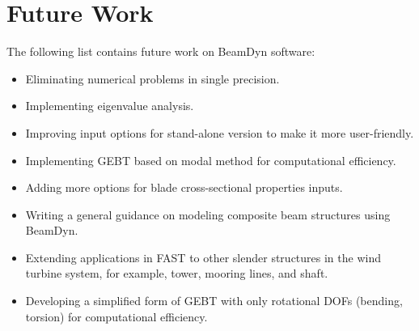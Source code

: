 \chapter{Future Work}
\label{sec:FutureWork}
The following list contains future work on BeamDyn software:

\begin{itemize}
   \item Eliminating numerical problems in single precision.
    \item Implementing eigenvalue analysis.
    \item Improving input options for stand-alone version to make it more user-friendly.
    \item Implementing GEBT based on modal method  for computational efficiency.
    \item Adding more options for blade cross-sectional properties inputs.
    \item Writing a general guidance on modeling composite beam structures using BeamDyn.
    \item Extending applications in FAST to other slender structures in the wind turbine system, for example, tower, mooring lines, and shaft.
    \item Developing a simplified form of GEBT with only rotational DOFs (bending, torsion) for computational efficiency.
\end{itemize}